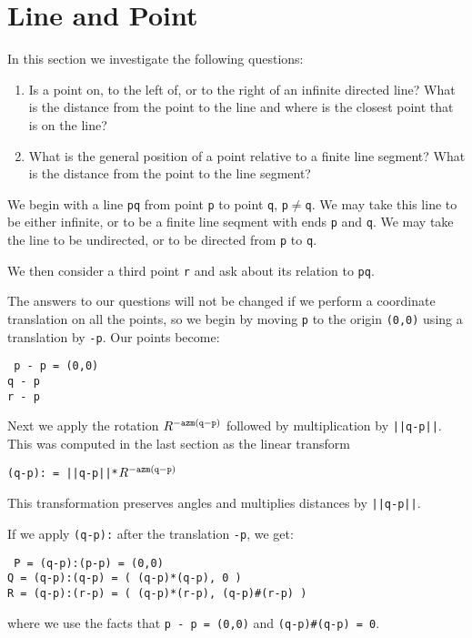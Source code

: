 \documentclass[12pt]{article}
\begin{document}
\newpage

\section{Line and Point}\label{LINE-AND-POINT}
In this section we investigate the following questions:
\begin{enumerate}
\item Is a point on, to the left of, or to the right of
an infinite directed line?  What is the distance from the
point to the line and where is the closest point that is
on the line?
\item What is the general position of a point relative
to a finite line segment?  What is the distance from the
point to the line segment?
\end{enumerate}

We begin with a line {\tt pq} from point {\tt p} to point {\tt q},
{\tt p$\neq$q}.
We may take this line to be either infinite, or to be a finite
line seqment with ends {\tt p} and {\tt q}.  We may take the
line to be undirected, or to be directed from {\tt p} to {\tt q}.

We then consider a third point {\tt r} and ask about its relation
to {\tt pq}.

The answers to our questions will not be changed if we perform
a coordinate translation on all the points, so we begin by moving
{\tt p} to the origin {\tt (0,0)} using a translation by {\tt -p}.
Our points become:
\begin{center} \tt
p - p = (0,0) \\
q - p \\
r - p
\end{center}
Next we apply the rotation $R^{\tt -azm(q-p)}$
followed by multiplication by {\tt ||q-p||}.  This was computed
in the last section as the linear transform \\
\centerline{\tt (q-p): = ||q-p||*$R^{\tt -azm(q-p)}$}
This transformation preserves angles and multiplies distances by {\tt ||q-p||}.

If we apply {\tt (q-p):} after the translation {\tt -p}, we get:
\begin{center} \tt
P = (q-p):(p-p) = (0,0) \\
Q = (q-p):(q-p) = ( (q-p)*(q-p), 0 ) \\
R = (q-p):(r-p) = ( (q-p)*(r-p), (q-p)\#(r-p) )
\end{center}
where we use the facts that {\tt p - p = (0,0)} and
{\tt (q-p)\#(q-p) = 0}.
\end{document}
